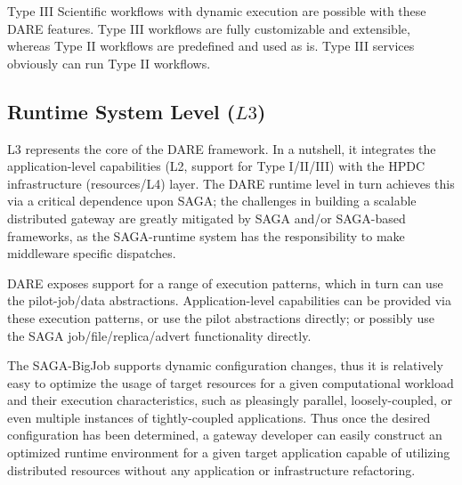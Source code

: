 \documentclass[]{svjour3}
\begin{document}
Type III Scientific workflows with dynamic execution are possible with
these DARE features. Type III workflows are fully customizable and
extensible, whereas Type II workflows are predefined and used as is.
Type III services obviously can run Type II workflows.


\subsection{Runtime System Level ($L3$)}

L3 represents the core of the DARE framework. In a nutshell, it
integrates the application-level capabilities (L2, support for Type
I/II/III) with the HPDC infrastructure (resources/L4) layer.  The DARE
runtime level in turn achieves this via a critical dependence upon
SAGA; the challenges in building a scalable distributed gateway are
greatly mitigated by SAGA and/or SAGA-based frameworks, as the
SAGA-runtime system has the responsibility to make middleware specific
dispatches.

DARE exposes support for a range of execution patterns, which in turn
can use the pilot-job/data abstractions.  Application-level
capabilities can be provided via these execution patterns, or use the
pilot abstractions directly; or possibly use the SAGA
job/file/replica/advert functionality directly.


The SAGA-BigJob supports dynamic configuration changes, thus it is
relatively easy to optimize the usage of target resources for a given
computational workload and their execution characteristics, such as
pleasingly parallel, loosely-coupled, or even multiple instances of
tightly-coupled applications. Thus once the desired configuration has
been determined, a gateway developer can easily construct an optimized
runtime environment for a given target application capable of
utilizing distributed resources without any application or
infrastructure refactoring.
\end{document}
